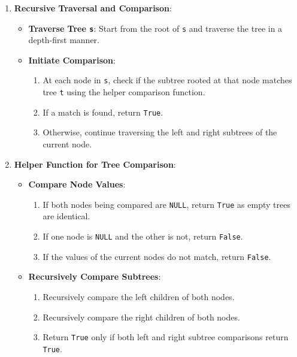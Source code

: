 \begin{enumerate}
    \item \textbf{Recursive Traversal and Comparison}:
    \begin{itemize}
        \item \textbf{Traverse Tree \texttt{s}}: Start from the root of \texttt{s} and traverse the tree in a depth-first manner.
        \item \textbf{Initiate Comparison}:
        \begin{enumerate}
            \item At each node in \texttt{s}, check if the subtree rooted at that node matches tree \texttt{t} using the helper comparison function.
            \item If a match is found, return \texttt{True}.
            \item Otherwise, continue traversing the left and right subtrees of the current node.
        \end{enumerate}
    \end{itemize}
    
    \item \textbf{Helper Function for Tree Comparison}:
    \begin{itemize}
        \item \textbf{Compare Node Values}:
        \begin{enumerate}
            \item If both nodes being compared are \texttt{NULL}, return \texttt{True} as empty trees are identical.
            \item If one node is \texttt{NULL} and the other is not, return \texttt{False}.
            \item If the values of the current nodes do not match, return \texttt{False}.
        \end{enumerate}
        \item \textbf{Recursively Compare Subtrees}:
        \begin{enumerate}
            \item Recursively compare the left children of both nodes.
            \item Recursively compare the right children of both nodes.
            \item Return \texttt{True} only if both left and right subtree comparisons return \texttt{True}.
        \end{enumerate}
    \end{itemize}
\end{enumerate}

